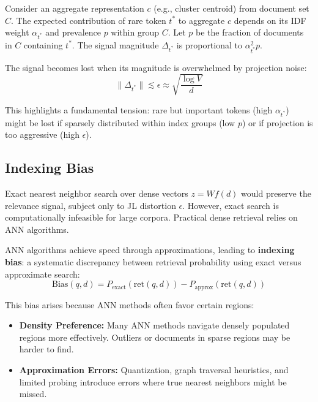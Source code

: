 \documentclass[conference,anonymous]{IEEEtran}
\begin{document}
Consider an aggregate representation $c$ (e.g., cluster centroid) from document set $C$. The expected contribution of rare token $t^*$ to aggregate $c$ depends on its IDF weight $\alpha_{t^*}$ and prevalence $p$ within group $C$. Let $p$ be the fraction of documents in $C$ containing $t^*$. The signal magnitude $\Delta_{t^*}$ is proportional to $\alpha_{t^*}^2 p$.

The signal becomes lost when its magnitude is overwhelmed by projection noise:
\begin{equation}
\|\Delta_{t^*}\| \lesssim \epsilon \approx \sqrt{\frac{\log V}{d}}
\label{eq:signal_loss_general}
\end{equation}

This highlights a fundamental tension: rare but important tokens (high $\alpha_{t^*}$) might be lost if sparsely distributed within index groups (low $p$) or if projection is too aggressive (high $\epsilon$).

\subsection{Indexing Bias}

Exact nearest neighbor search over dense vectors $z = Wf(d)$ would preserve the relevance signal, subject only to JL distortion $\epsilon$. However, exact search is computationally infeasible for large corpora. Practical dense retrieval relies on ANN algorithms.

ANN algorithms achieve speed through approximations, leading to \textbf{indexing bias}: a systematic discrepancy between retrieval probability using exact versus approximate search:
\begin{equation}
\text{Bias}(q, d) = P_{\text{exact}}(\text{ret}(q, d)) - P_{\text{approx}}(\text{ret}(q, d))
\label{eq:indexing_bias}
\end{equation}

This bias arises because ANN methods often favor certain regions:
\begin{itemize}
    \item \textbf{Density Preference:} Many ANN methods navigate densely populated regions more effectively. Outliers or documents in sparse regions may be harder to find.
    
    \item \textbf{Approximation Errors:} Quantization, graph traversal heuristics, and limited probing introduce errors where true nearest neighbors might be missed.
\end{itemize}
\end{document}
